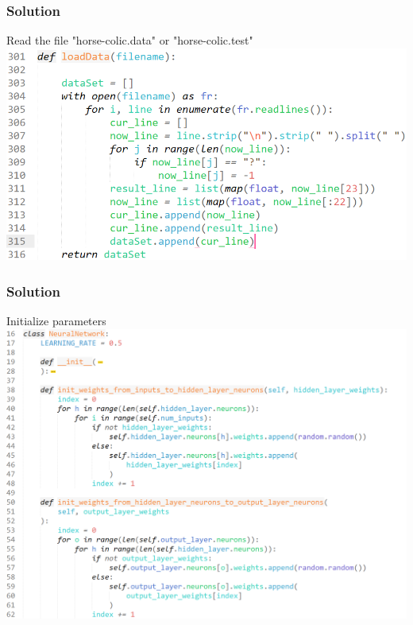 \documentclass{beamer}
\begin{document}
\begin{frame}
  \frametitle{Solution}
      Read the file "horse-colic.data" or "horse-colic.test"
      \\[10pt]
      \includegraphics[width=1.0\textwidth]{Pic/loadData.png}


\end{frame}

\begin{frame}
  \frametitle{Solution}

      Initialize parameters
      \\[10pt]
      \includegraphics[width=1.0\textwidth]{Pic/init_params.png}

\end{frame}
\end{document}
